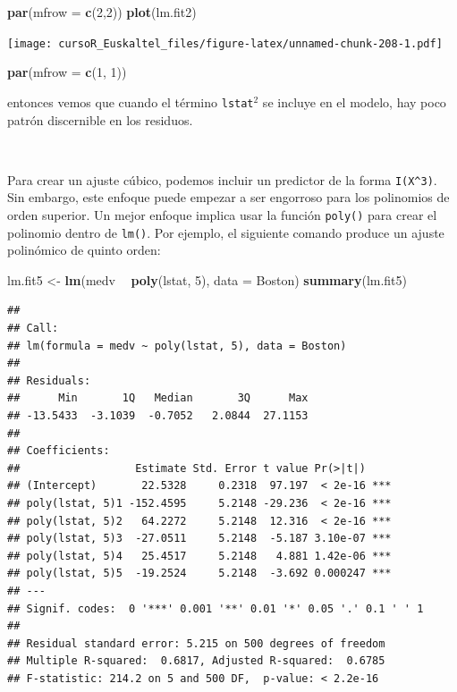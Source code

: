 \documentclass[]{book}
\newenvironment{Shaded}{\begin{snugshade}}{\end{snugshade}}
\newcommand{\KeywordTok}[1]{\textcolor[rgb]{0.13,0.29,0.53}{\textbf{#1}}}
\newcommand{\DataTypeTok}[1]{\textcolor[rgb]{0.13,0.29,0.53}{#1}}
\newcommand{\DecValTok}[1]{\textcolor[rgb]{0.00,0.00,0.81}{#1}}
\newcommand{\StringTok}[1]{\textcolor[rgb]{0.31,0.60,0.02}{#1}}
\newcommand{\OperatorTok}[1]{\textcolor[rgb]{0.81,0.36,0.00}{\textbf{#1}}}
\newcommand{\NormalTok}[1]{#1}
\begin{document}
\begin{Shaded}
\begin{Highlighting}[]
\KeywordTok{par}\NormalTok{(}\DataTypeTok{mfrow =} \KeywordTok{c}\NormalTok{(}\DecValTok{2}\NormalTok{,}\DecValTok{2}\NormalTok{))}
\KeywordTok{plot}\NormalTok{(lm.fit2)}
\end{Highlighting}
\end{Shaded}

\texttt{[image: cursoR\_Euskaltel\_files/figure-latex/unnamed-chunk-208-1.pdf]}

\begin{Shaded}
\begin{Highlighting}[]
\KeywordTok{par}\NormalTok{(}\DataTypeTok{mfrow =} \KeywordTok{c}\NormalTok{(}\DecValTok{1}\NormalTok{, }\DecValTok{1}\NormalTok{))}
\end{Highlighting}
\end{Shaded}

entonces vemos que cuando el término \texttt{lstat}\(^2\) se incluye en
el modelo, hay poco patrón discernible en los residuos.

~

Para crear un ajuste cúbico, podemos incluir un predictor de la forma
\texttt{I(X\^{}3)}. Sin embargo, este enfoque puede empezar a ser
engorroso para los polinomios de orden superior. Un mejor enfoque
implica usar la función \texttt{poly()} para crear el polinomio dentro
de \texttt{lm()}. Por ejemplo, el siguiente comando produce un ajuste
polinómico de quinto orden:

\begin{Shaded}
\begin{Highlighting}[]
\NormalTok{lm.fit5 <-}\StringTok{ }\KeywordTok{lm}\NormalTok{(medv }\OperatorTok{~}\StringTok{ }\KeywordTok{poly}\NormalTok{(lstat, }\DecValTok{5}\NormalTok{), }\DataTypeTok{data =}\NormalTok{ Boston)}
\KeywordTok{summary}\NormalTok{(lm.fit5)}
\end{Highlighting}
\end{Shaded}

\begin{verbatim}
## 
## Call:
## lm(formula = medv ~ poly(lstat, 5), data = Boston)
## 
## Residuals:
##      Min       1Q   Median       3Q      Max 
## -13.5433  -3.1039  -0.7052   2.0844  27.1153 
## 
## Coefficients:
##                  Estimate Std. Error t value Pr(>|t|)    
## (Intercept)       22.5328     0.2318  97.197  < 2e-16 ***
## poly(lstat, 5)1 -152.4595     5.2148 -29.236  < 2e-16 ***
## poly(lstat, 5)2   64.2272     5.2148  12.316  < 2e-16 ***
## poly(lstat, 5)3  -27.0511     5.2148  -5.187 3.10e-07 ***
## poly(lstat, 5)4   25.4517     5.2148   4.881 1.42e-06 ***
## poly(lstat, 5)5  -19.2524     5.2148  -3.692 0.000247 ***
## ---
## Signif. codes:  0 '***' 0.001 '**' 0.01 '*' 0.05 '.' 0.1 ' ' 1
## 
## Residual standard error: 5.215 on 500 degrees of freedom
## Multiple R-squared:  0.6817, Adjusted R-squared:  0.6785 
## F-statistic: 214.2 on 5 and 500 DF,  p-value: < 2.2e-16
\end{verbatim}
\end{document}
